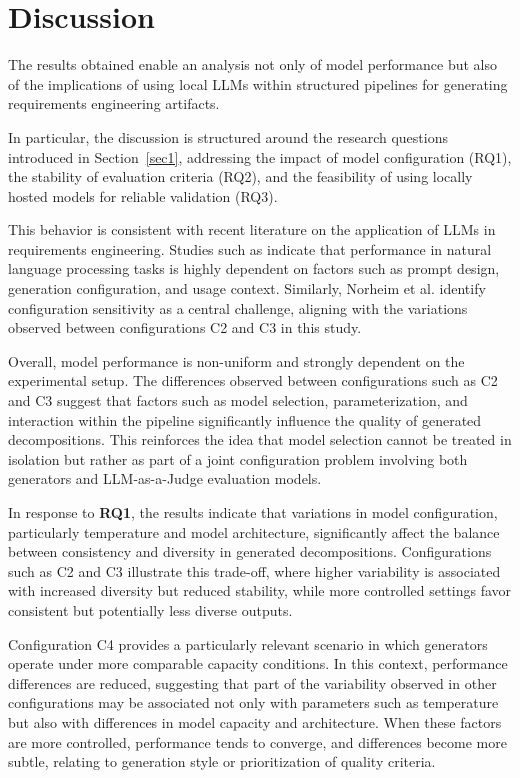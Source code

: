 \documentclass[pdflatex,sn-mathphys-num]{sn-jnl}
\theoremstyle{thmstyleone}%
\theoremstyle{thmstyletwo}%
\theoremstyle{thmstylethree}%
\begin{document}
\section{Discussion}\label{sec5}

The results obtained enable an analysis not only of model performance but also of the implications of using local LLMs within structured pipelines for generating requirements engineering artifacts.

In particular, the discussion is structured around the research questions introduced in Section~\ref{sec1}, addressing the impact of model configuration (RQ1), the stability of evaluation criteria (RQ2), and the feasibility of using locally hosted models for reliable validation (RQ3).

This behavior is consistent with recent literature on the application of LLMs in requirements engineering. Studies such as \cite{zadenoori2025} indicate that performance in natural language processing tasks is highly dependent on factors such as prompt design, generation configuration, and usage context. Similarly, Norheim et al. \cite{sami2024} identify configuration sensitivity as a central challenge, aligning with the variations observed between configurations C2 and C3 in this study.

Overall, model performance is non-uniform and strongly dependent on the experimental setup. The differences observed between configurations such as C2 and C3 suggest that factors such as model selection, parameterization, and interaction within the pipeline significantly influence the quality of generated decompositions. This reinforces the idea that model selection cannot be treated in isolation but rather as part of a joint configuration problem involving both generators and LLM-as-a-Judge evaluation models.

In response to \textbf{RQ1}, the results indicate that variations in model configuration, particularly temperature and model architecture, significantly affect the balance between consistency and diversity in generated decompositions. Configurations such as C2 and C3 illustrate this trade-off, where higher variability is associated with increased diversity but reduced stability, while more controlled settings favor consistent but potentially less diverse outputs.

Configuration C4 provides a particularly relevant scenario in which generators operate under more comparable capacity conditions. In this context, performance differences are reduced, suggesting that part of the variability observed in other configurations may be associated not only with parameters such as temperature but also with differences in model capacity and architecture. When these factors are more controlled, performance tends to converge, and differences become more subtle, relating to generation style or prioritization of quality criteria.
\end{document}
